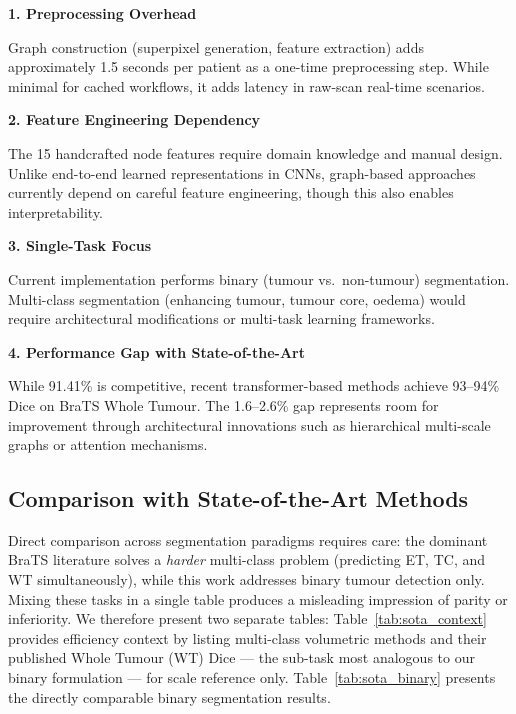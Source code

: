 \textbf{1. Preprocessing Overhead}

Graph construction (superpixel generation, feature extraction) adds approximately 1.5 seconds per patient as a one-time preprocessing step. While minimal for cached workflows, it adds latency in raw-scan real-time scenarios.

\textbf{2. Feature Engineering Dependency}

The 15 handcrafted node features require domain knowledge and manual design. Unlike end-to-end learned representations in CNNs, graph-based approaches currently depend on careful feature engineering, though this also enables interpretability.

\textbf{3. Single-Task Focus}

Current implementation performs binary (tumour vs.\ non-tumour) segmentation. Multi-class segmentation (enhancing tumour, tumour core, oedema) would require architectural modifications or multi-task learning frameworks.

\textbf{4. Performance Gap with State-of-the-Art}

While 91.41\% is competitive, recent transformer-based methods achieve 93--94\% Dice on BraTS Whole Tumour. The 1.6--2.6\% gap represents room for improvement through architectural innovations such as hierarchical multi-scale graphs or attention mechanisms.


\subsection{Comparison with State-of-the-Art Methods}

Direct comparison across segmentation paradigms requires care: the dominant BraTS literature solves a \textit{harder} multi-class problem (predicting ET, TC, and WT simultaneously), while this work addresses binary tumour detection only. Mixing these tasks in a single table produces a misleading impression of parity or inferiority. We therefore present two separate tables: Table~\ref{tab:sota_context} provides efficiency context by listing multi-class volumetric methods and their published Whole Tumour (WT) Dice — the sub-task most analogous to our binary formulation — for scale reference only. Table~\ref{tab:sota_binary} presents the directly comparable binary segmentation results.

